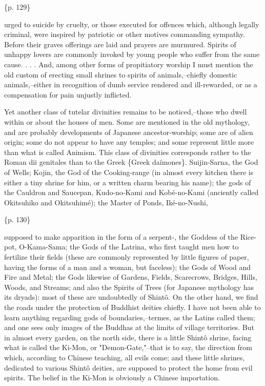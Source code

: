 \{p. 129\}

urged to suicide by cruelty, or those executed for offences which, although legally criminal, were inspired by patriotic or other motives commanding sympathy. Before their graves offerings are laid and prayers are murmured. Spirits of unhappy lovers are commonly invoked by young people who suffer from the same cause. . . . And, among other forms of propitiatory worship I must mention the old custom of erecting small shrines to spirits of animals,--chiefly domestic animals,--either in recognition of dumb service rendered and ill-rewarded, or as a compensation for pain unjustly inflicted.



Yet another class of tutelar divinities remains to be noticed,--those who dwell within or about the houses of men. Some are mentioned in the old mythology, and are probably developments of Japanese ancestor-worship; some are of alien origin; some do not appear to have any temples; and some represent little more than what is called Animism. This class of divinities corresponds rather to the Roman dii genitales than to the Greek \{Greek daímones\}. Suijin-Sarna, the God of Wells; Kojin, the God of the Cooking-range (in almost every kitchen there is either a tiny shrine for him, or a written charm bearing his name); the gods of the Cauldron and Saucepan, Kudo-no-Kami and Kobé-no-Kami (anciently called Okitsuhiko and Okitsuhimé); the Master of Ponds, Iké-no-Nushi,

\{p. 130\}

supposed to make apparition in the form of a serpent-, the Goddess of the Rice-pot, O-Kama-Sama; the Gods of the Latrina, who first taught men how to fertilize their fields (these are commonly represented by little figures of paper, having the forms of a man and a woman, but faceless); the Gods of Wood and Fire and Metal; the Gods likewise of Gardens, Fields, Scarecrows, Bridges, Hills, Woods, and Streams; and also the Spirits of Trees (for Japanese mythology has its dryads): most of these are undoubtedly of Shintô. On the other hand, we find the roads under the protection of Buddhist deities chiefly. I have not been able to learn anything regarding gods of boundaries,--termes, as the Latins called them; and one sees only images of the Buddhas at the limits of village territories. But in almost every garden, on the north side, there is a little Shintô shrine, facing what is called the Ki-Mon, or "Demon-Gate,"--that is to say, the direction from which, according to Chinese teaching, all evils come; and these little shrines, dedicated to various Shintô deities, are supposed to protect the home from evil spirits. The belief in the Ki-Mon is obviously a Chinese importation.

